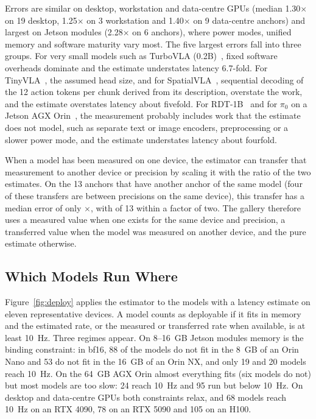 \documentclass[applsci,review,submit,pdftex,oneauthor]{Definitions/mdpi}
\begin{document}
Errors are similar on desktop, workstation and data-centre GPUs (median 1.30$\times$ on 19 desktop, 1.25$\times$ on 3 workstation and 1.40$\times$ on 9 data-centre anchors) and largest on Jetson modules (2.28$\times$ on 6 anchors), where power modes, unified memory and software maturity vary most. The five largest errors fall into three groups. For very small models such as TurboVLA (0.2B)~\cite{ax260727205}, fixed software overheads dominate and the estimate understates latency 6.7-fold. For TinyVLA~\cite{ax240912514}, the assumed head size, and for SpatialVLA~\cite{ax250115830}, sequential decoding of the 12 action tokens per chunk derived from its description, overstate the work, and the estimate overstates latency about fivefold. For RDT-1B~\cite{ax241007864} and for $\pi_0$ on a Jetson AGX Orin~\cite{ax241024164}, the measurement probably includes work that the estimate does not model, such as separate text or image encoders, preprocessing or a slower power mode, and the estimate understates latency about fourfold.

When a model has been measured on one device, the estimator can transfer that measurement to another device or precision by scaling it with the ratio of the two estimates. On the 13 anchors that have another anchor of the same model (four of these transfers are between precisions on the same device), this transfer has a median error of only \trMed$\times$, with \trWithinTwo{} of 13 within a factor of two. The gallery therefore uses a measured value when one exists for the same device and precision, a transferred value when the model was measured on another device, and the pure estimate otherwise.

\subsection{Which Models Run Where}

Figure~\ref{fig:deploy} applies the estimator to the \nAssess{} models with a latency estimate on eleven representative devices. A model counts as deployable if it fits in memory and the estimated rate, or the measured or transferred rate when available, is at least 10~Hz. Three regimes appear. On 8--16~GB Jetson modules memory is the binding constraint: in bf16, 88 of the \nAssess{} models do not fit in the 8~GB of an Orin Nano and 53 do not fit in the 16~GB of an Orin NX, and only 19 and 20 models reach 10~Hz. On the 64~GB AGX Orin almost everything fits (six models do not) but most models are too slow: 24 reach 10~Hz and 95 run but below 10~Hz. On desktop and data-centre GPUs both constraints relax, and 68 models reach 10~Hz on an RTX 4090, 78 on an RTX 5090 and 105 on an H100.
\end{document}
